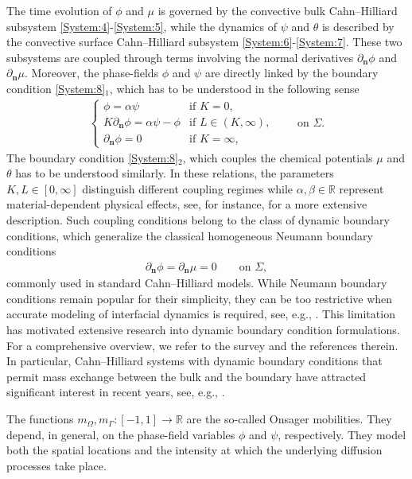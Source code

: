 \documentclass[10pt,reqno]{amsart}
\theoremstyle{remark}
\numberwithin{equation}{section}
\newcommand{\R}{\mathbb R}
\newcommand{\n}{\mathbf{n}}
\newcommand{\deln}{\partial_\n}
\newcommand{\Om}{\Omega}
\newcommand{\Ga}{\Gamma}
\begin{document}
The time evolution of $\phi$ and $\mu$ is governed by the convective bulk Cahn--Hilliard subsystem \eqref{System:4}-\eqref{System:5}, while the dynamics of $\psi$ and $\theta$ is described by the convective surface Cahn--Hilliard subsystem \eqref{System:6}-\eqref{System:7}. These two subsystems are coupled through terms involving the normal derivatives $\deln\phi$ and $\deln\mu$. Moreover, the phase-fields $\phi$ and $\psi$ are directly linked by the boundary condition \eqref{System:8}$_1$, which has to be understood in the following sense
\begin{align*}
    \begin{cases}
        \phi = \alpha\psi &\text{if~} K = 0, \\
        K\deln\phi = \alpha\psi - \phi &\text{if~} L\in(K,\infty), \\
        \deln\phi = 0 &\text{if~} K = \infty, 
    \end{cases} \qquad\text{on~}\Sigma.
\end{align*}
The boundary condition \eqref{System:8}$_2$, which couples the chemical potentials $\mu$ and $\theta$ has to be understood similarly. In these relations, the parameters $K,L\in[0,\infty]$ distinguish different coupling regimes while $\alpha,\beta\in\R$ represent material-dependent physical effects, see, for instance, \cite{Giorgini2023, Knopf2024} for a more extensive description. Such coupling conditions belong to the class of dynamic boundary conditions, which generalize the classical homogeneous Neumann boundary conditions
\begin{align*}
    \deln\phi = \deln\mu = 0 \qquad\text{on~}\Sigma,
\end{align*}
commonly used in standard Cahn--Hilliard models. While Neumann boundary conditions remain popular for their simplicity, they can be too restrictive when accurate modeling of interfacial dynamics is required, see, e.g., \cite{Giorgini2023, Knopf2024}. This limitation has motivated extensive research into dynamic boundary condition formulations. For a comprehensive overview, we refer to the survey \cite{Wu2022} and the references therein. In particular, Cahn--Hilliard systems with dynamic boundary conditions that permit mass exchange between the bulk and the boundary have attracted significant interest in recent years, see, e.g., \cite{Goldstein2011, Liu2019, Knopf2020, Knopf2021a}. 

The functions $m_\Om, m_\Ga:[-1,1]\rightarrow\R$ are the so-called Onsager mobilities. They depend, in general, on the phase-field variables $\phi$ and $\psi$, respectively. They model both the spatial locations and the intensity at which the underlying diffusion processes take place.
\end{document}
